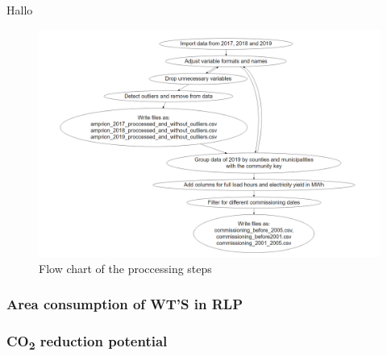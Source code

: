 \documentclass[a4paper,11pt]{article}
\begin{document}
Hallo
\begin{figure}

{\centering \includegraphics[width=1\linewidth]{data/Amprion/results_of_preparation/flow} 

}

\caption{Flow chart of the proccessing steps}\label{fig:preparation}
\end{figure}
\hypertarget{area-consumption-of-wts-in-rlp}{%
\subsubsection{Area consumption of WT'S in RLP}\label{area-consumption-of-wts-in-rlp}}

\hypertarget{co-reduction-potential}{%
\subsubsection{\texorpdfstring{CO\textsubscript{2} reduction potential}{CO reduction potential}}\label{co-reduction-potential}}
\end{document}
